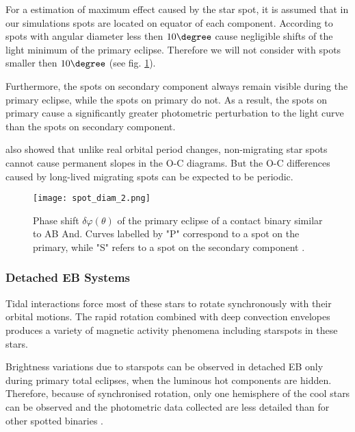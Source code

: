 For a estimation of maximum effect caused by the star spot, it is assumed that in our simulations spots are located on equator of each component.
According to \cite{Kalimeris2002} spots with angular diameter less then $10\degree$ cause negligible shifts of the light minimum of the primary eclipse. Therefore we will not consider with spots smaller then $10\degree$ (see fig. \ref{fig:spot_diam}).

Furthermore, the spots on secondary component always remain visible during the primary eclipse,
while the spots on primary do not. As a result, the spots on primary cause a
significantly greater photometric perturbation to the light curve than the spots on secondary component.

\citeauthor{Kalimeris2002} also showed that unlike real orbital period changes, non-migrating star spots cannot
cause permanent slopes in the O-C diagrams. 
But the O-C differences caused by long-lived migrating spots can be expected to be periodic.

\begin{figure}[!h]
\vspace{0cm}
\centerline{\texttt{[image: spot\_diam\_2.png]}}
\caption{Phase shift $\delta\varphi(\theta)$ of the primary eclipse of a contact
binary similar to AB And. Curves labelled by "P" correspond
to a spot on the primary, while "S" refers to a spot on the
secondary component \cite{Kalimeris2002}.}
\label{fig:spot_diam}
\end{figure}   
 

\subsubsection{Detached EB Systems}

Tidal interactions force most of these stars to rotate synchronously with their orbital motions. 
The rapid rotation combined with deep convection envelopes produces a variety of magnetic activity phenomena including starspots in
these stars.

Brightness variations due to starspots can be observed in detached EB only during primary total
eclipses, when the luminous hot components are hidden. Therefore, because of synchronised rotation, 
only one hemisphere of the cool stars can be observed and the photometric data
collected are less detailed than for other spotted binaries \citep{Berdyugina2005}.
 
